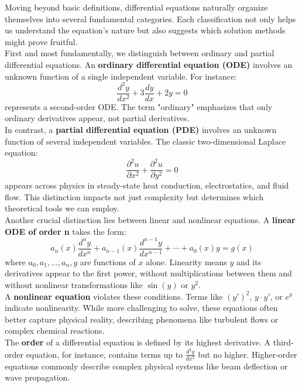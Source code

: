 \noindent Moving beyond basic definitions, differential equations naturally organize themselves into several fundamental categories. Each classification not only helps us understand the equation's nature but also suggests which solution methods might prove fruitful. \\

\noindent First and most fundamentally, we distinguish between ordinary and partial differential equations. An \textbf{ordinary differential equation (ODE)}  involves an unknown function of a single independent variable. For instance:
\[
\frac{d^2 y}{dx^2} + 3\frac{dy}{dx} + 2y = 0
\]
represents a second-order ODE. The term "ordinary" emphasizes that only ordinary derivatives appear, not partial derivatives. \\

\noindent In contrast, a \textbf{partial differential equation (PDE)}  involves an unknown function of several independent variables. The classic two-dimensional Laplace equation:
\[
\frac{\partial^2 u}{\partial x^2} + \frac{\partial^2 u}{\partial y^2} = 0
\]
appears across physics in steady-state heat conduction, electrostatics, and fluid flow. This distinction impacts not just complexity but determines which theoretical tools we can employ. \\

\noindent Another crucial distinction lies between linear and nonlinear equations. A \textbf{linear ODE of order n}  takes the form:
\[
a_n(x)\frac{d^n y}{dx^n} + a_{n-1}(x)\frac{d^{n-1}y}{dx^{n-1}} + \cdots + a_0(x)y = g(x)
\]
where $a_0, a_1, \dots, a_n, g$ are functions of $x$ alone. Linearity means $y$ and its derivatives appear to the first power, without multiplications between them and without nonlinear transformations like $\sin(y)$ or $y^2$. \\

\noindent A \textbf{nonlinear equation}  violates these conditions. Terms like $(y')^2$, $y \cdot y'$, or $e^y$ indicate nonlinearity. While more challenging to solve, these equations often better capture physical reality, describing phenomena like turbulent flows or complex chemical reactions. \\

\noindent The \textbf{order}  of a differential equation is defined by its highest derivative. A third-order equation, for instance, contains terms up to $\frac{d^3y}{dx^3}$ but no higher. Higher-order equations commonly describe complex physical systems like beam deflection or wave propagation. \\

